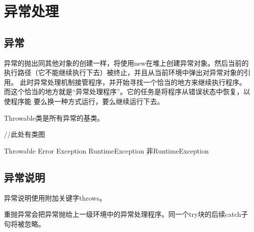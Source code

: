 \chapter{异常处理}

\section{异常}

\label{chap:exception}

异常的抛出同其他对象的创建一样，将使用new在堆上创建异常对象。然后当前的执行路径（它不能继续执行下去）被终止，并且从当前环境中弹出对异常对象的引用。
此时异常处理机制接管程序，并开始寻找一个恰当的地方来继续执行程序。而这个恰当的地方就是“异常处理程序”。它的任务是将程序从错误状态中恢复，以使程序能
要么换一种方式运行，要么继续运行下去。

Throwable类是所有异常的基类。

//此处有类图

Throwable Error Exception RuntimeException 非RuntimeException




\section{异常说明}

异常说明使用附加关键字throws。



重抛异常会把异常抛给上一级环境中的异常处理程序。同一个try块的后续catch子句将被忽略。




